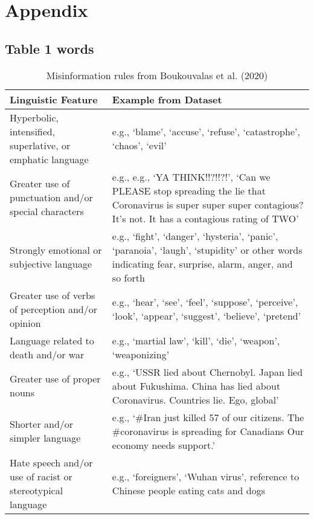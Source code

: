 \documentclass{article}
\begin{document}
\hypertarget{appendix}{%
\section*{Appendix}\label{appendix}}

\label{sec:appendix}

\hypertarget{table-1-words}{%
\subsection{Table 1 words}\label{table-1-words}}

\begin{table}[htp]
 \caption{Misinformation rules from Boukouvalas et al. (2020)}
  \centering
  \begin{tabular}{p{6cm}|p{9cm}}
    \hline
    \textbf{Linguistic Feature} & \textbf{Example from Dataset} \\ [0.5 ex]
    \hline\hline
    Hyperbolic, intensified, superlative, or emphatic language & e.g., ‘blame’, ‘accuse’, ‘refuse’, ‘catastrophe’, ‘chaos’, ‘evil’ \\
    \hline
    Greater use of punctuation and/or special characters & e.g., e.g., ‘YA THINK!!?!!?!’, ‘Can we PLEASE stop spreading the lie that Coronavirus is super super super contagious? It’s not. It has a contagious rating of TWO’ \\
    \hline
    Strongly emotional or subjective language & e.g., ‘fight’, ‘danger’, ‘hysteria’, ‘panic’, ‘paranoia’, ‘laugh’, ‘stupidity’ or other words indicating fear, surprise, alarm, anger, and so forth \\
    \hline
    Greater use of verbs of perception and/or opinion & e.g., ‘hear’, ‘see’, ‘feel’, ‘suppose’, ‘perceive’, ‘look’, ‘appear’, ‘suggest’, ‘believe’, ‘pretend’ \\
    \hline
    Language related to death and/or war & e.g., ‘martial law’, ‘kill’, ‘die’, ‘weapon’, ‘weaponizing’ \\
    \hline
    Greater use of proper nouns & e.g., ‘USSR lied about Chernobyl. Japan lied about Fukushima. China has lied about Coronavirus. Countries lie. Ego, global’ \\
    \hline
    Shorter and/or simpler language & e.g., ‘\#Iran just killed 57 of our citizens. The \#coronavirus is spreading for Canadians Our economy needs support.’ \\
    \hline
    Hate speech and/or use of racist or stereotypical language & e.g., ‘foreigners’, ‘Wuhan virus’, reference to Chinese people eating cats and dogs \\

\end{tabular}
\end{table}
\end{document}
